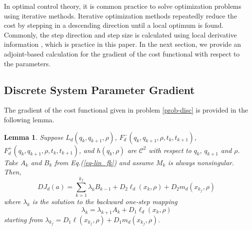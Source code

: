 \documentclass[letterpaper, 10pt, conference]{ieeeconf}
\newtheorem{lemma}{Lemma}
\begin{document}
In optimal control theory, it is common practice to solve optimization problems using iterative methods.  Iterative optimization methods repeatedly reduce the cost by stepping in a descending direction until a local optimum is found.  Commonly, the step direction and step size is calculated using local derivative information \cite{armijo, kelley}, which is practice in this paper.  In the next section, we provide an adjoint-based calculation for the gradient of the cost functional with respect to the parameters.

\subsection{Discrete System Parameter Gradient}
The gradient of the cost functional given in problem \ref{prob-disc} is provided in the following lemma.
\begin{lemma}
\label{lem-grad_a}
Suppose $L_d(q_k,q_{k+1},\rho)$, $F_d^-(q_k,q_{k+1},\rho,t_k,t_{k+1})$, $F_d^+(q_k,q_{k+1},\rho,t_k,t_{k+1})$, and $h(q_k,\rho)$ are $\mathcal{C}^2$ with respect to $q_k$, $q_{k+1}$ and $\rho$.  Take $A_k$ and $B_k$ from Eq.(\ref{eq-lin_fk}) and assume $M_k$ is always nonsingular.  Then,
\begin{equation}
DJ_d(a) = \sum_{k = 1}^{k_f}\lambda_kB_{k-1} +D_2\ell_d(x_k,\rho) + D_2m_d(x_{k_f},\rho)
\label{eq-DJa}
\end{equation}
where $\lambda_k$ is the solution to the backward one-step mapping
\begin{equation}
\lambda_k = \lambda_{k+1}A_{k} + D_1\ell_d(x_{k},\rho) 
\label{eq-lambda}
\end{equation}
starting from $\lambda_{k_f} = D_1\ell(x_{k_f},\rho) + D_1m_d(x_{k_f},\rho)$.  
\end{lemma}
\end{document}
